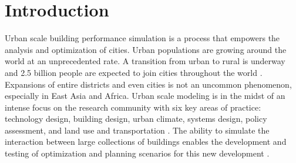 \documentclass{tBPS2e}
\theoremstyle{plain}
\theoremstyle{definition}
\theoremstyle{remark}
\newcommand{\noteCM}[1]{\footnote{\textcolor{red}{#1}}}
\newcommand{\noteJK}[1]{\footnote{\textcolor{blue}{#1}}}
\newcommand{\noteDT}[1]{\footnote{\textcolor{green}{#1}}}
\begin{document}

\linenumbers

\section{Introduction}

Urban scale building performance simulation is a process that empowers the
analysis and optimization of cities. Urban populations are growing around the
world at an unprecedented rate. A transition from urban to rural is underway and
2.5 billion people are expected to join cities throughout the world
\citep{UnitedNations:2014vn}. Expansions of entire districts and even cities
is not an uncommon phenomenon, especially in East Asia and Africa. Urban scale
modeling is in the midst of an intense focus on the research community with
six key areas of practice: technology design, building design, urban climate,
systems design, policy assessment, and land use and transportation
\citep{Keirstead:2012ct}. The ability to simulate the interaction between
large collections of buildings enables the development and testing of
optimization and planning scenarios for this new development
\citep{Dorer:2013vt}.
\end{document}
